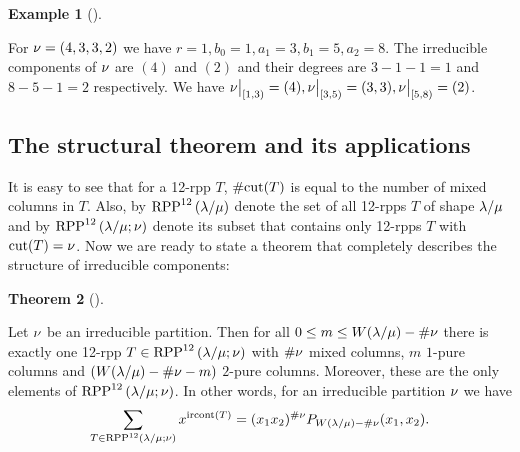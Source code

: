 \documentclass[numbers=enddot,12pt,final,onecolumn,notitlepage]{scrartcl}%
\theoremstyle{definition}
\newtheorem{theo}{Theorem}[section]
\newenvironment{theorem}[1][]
{\begin{theo}[#1]\begin{leftbar}}
{\end{leftbar}\end{theo}}
\newtheorem{exmp}[theo]{Example}
\newenvironment{example}[1][]
{\begin{exmp}[#1]\begin{leftbar}}
{\end{leftbar}\end{exmp}}
\let\sumnonlimits\sum
\renewcommand{\sum}{\sumnonlimits\limits}
\begin{document}
\begin{example}
 For ${{\nu}}=(4,3,3,2)$ we have $r=1,b_0=1,a_1=3,b_1=5,a_2=8$. The irreducible components of ${{\nu}}$ are $(4)$ and $(2)$ and their degrees are $3-1-1=1$ and $8-5-1=2$ respectively. We have ${{{\nu}}\big|_{[1,3)}}=(4),{{{\nu}}\big|_{[3,5)}}=(3,3),{{{\nu}}\big|_{[5,8)}}=(2)$.
\end{example}


\subsection{The structural theorem and its applications}
It is easy to see that for a 12-rpp $T$, $\#{\operatorname*{cut}}(T)$ is equal to the number of mixed columns in $T$. Also, by ${\operatorname*{RPP}^{12}\left( \lambda/\mu\right)}$ denote the set of all 12-rpps $T$ of shape ${\lambda/\mu}$ and by ${\operatorname*{RPP}^{12}\left( \lambda/\mu ;{{\nu}} \right)}$ denote its subset that contains only 12-rpps $T$ with ${\operatorname*{cut}}(T)={{\nu}}$. Now we are ready to state a theorem that completely describes the structure of irreducible components:
\begin{theorem}
\label{thm:12rpps}
 Let ${{\nu}}$ be an irreducible partition. Then for all $0\leq m\leq W({\lambda/\mu})-\#{{\nu}}$ there is exactly one 12-rpp $T\in{\operatorname*{RPP}^{12}\left( \lambda/\mu ;{{\nu}}\right)}$ with $\#{{\nu}}$ mixed columns, $m$ $1$-pure columns and $(W({\lambda/\mu})-\#{{\nu}}-m)$ $2$-pure columns. Moreover, these are the only elements of ${\operatorname*{RPP}^{12}\left( \lambda/\mu ;{{\nu}} \right)}$. In other words, for an irreducible partition ${{\nu}}$ we have
  \begin{equation}
 \label{eq:thm12rpps}
 \sum_{T\in\OneTwoRPPCutvar} x^{\ircont(T)}=(x_1x_2)^{\#\cutvar} P_{W(\lm)-\#\cutvar}(x_1,x_2).
 \end{equation}
\end{theorem}
\end{document}
